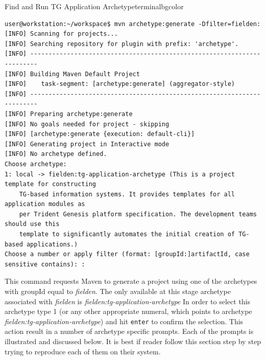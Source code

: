   \begin{code}{Find and Run TG Application Archetype}{\label{lst:find-and-run-archetype}}{terminalbgcolor}
    \begin{lstlisting}
user@workstation:~/workspace$ mvn archetype:generate -Dfilter=fielden:
[INFO] Scanning for projects...
[INFO] Searching repository for plugin with prefix: 'archetype'.
[INFO] ------------------------------------------------------------------------
[INFO] Building Maven Default Project
[INFO]    task-segment: [archetype:generate] (aggregator-style)
[INFO] ------------------------------------------------------------------------
[INFO] Preparing archetype:generate
[INFO] No goals needed for project - skipping
[INFO] [archetype:generate {execution: default-cli}]
[INFO] Generating project in Interactive mode
[INFO] No archetype defined.
Choose archetype:
1: local -> fielden:tg-application-archetype (This is a project template for constructing 
	TG-based information systems. It provides templates for all application modules as 
	per Trident Genesis platform specification. The development teams should use this 
	template to significantly automates the initial creation of TG-based applications.)
Choose a number or apply filter (format: [groupId:]artifactId, case sensitive contains): : 
    \end{lstlisting}
  \end{code}

  This command requests Maven to generate a project using one of the archetypes with groupId equal to \emph{fielden}.
  The only available at this stage archetype associated with \emph{fielden} is \emph{fielden:tg-application-archetype}
  In order to select this archetype type 1 (or any other appropriate numeral, which points to archetype \emph{fielden:tg-application-archetype}) and hit \texttt{enter} to confirm the selection. 
  This action result in a number of archetype specific prompts. 
  Each of the prompts is illustrated and discussed below.
  It is best if reader follow this section step by step trying to reproduce each of them on their system.


